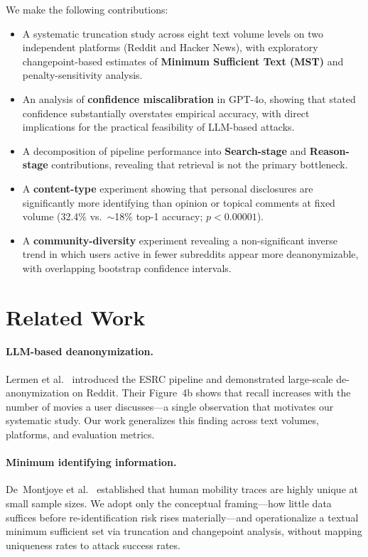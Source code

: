 \documentclass[sigplan,screen,nonacm]{acmart}
\begin{document}
We make the following contributions:
\begin{itemize}
  \item A systematic truncation study across eight text volume levels on two
        independent platforms (Reddit and Hacker News), with exploratory
        changepoint-based estimates of \textbf{Minimum Sufficient Text (MST)} and
        penalty-sensitivity analysis.
  \item An analysis of \textbf{confidence miscalibration} in GPT-4o, showing that
        stated confidence substantially overstates empirical accuracy, with direct
        implications for the practical feasibility of LLM-based attacks.
  \item A decomposition of pipeline performance into \textbf{Search-stage} and
        \textbf{Reason-stage} contributions, revealing that retrieval is not the
        primary bottleneck.
  \item A \textbf{content-type} experiment showing that personal disclosures are
        significantly more identifying than opinion or topical comments at fixed
        volume (32.4\% vs.\ $\sim$18\% top-1 accuracy; $p < 0.00001$).
  \item A \textbf{community-diversity} experiment revealing a non-significant inverse
        trend in which users active in fewer subreddits appear more deanonymizable,
        with overlapping bootstrap confidence intervals.
\end{itemize}


\section{Related Work}


\paragraph{LLM-based deanonymization.}
Lermen et al.~\cite{lermen2026} introduced the ESRC pipeline and demonstrated large-scale de-anonymization on Reddit. Their Figure~4b shows that recall increases
with the number of movies a user discusses---a single observation that motivates
our systematic study. Our work generalizes this finding across text volumes,
platforms, and evaluation metrics.

\paragraph{Minimum identifying information.}
De~Montjoye et al.~\cite{demontjoye2013} established that human mobility traces are
highly unique at small sample sizes. We adopt only the conceptual framing---how
little data suffices before re-identification risk rises materially---and
operationalize a textual minimum sufficient set via truncation and changepoint
analysis, without mapping uniqueness rates to attack success rates.
\end{document}
